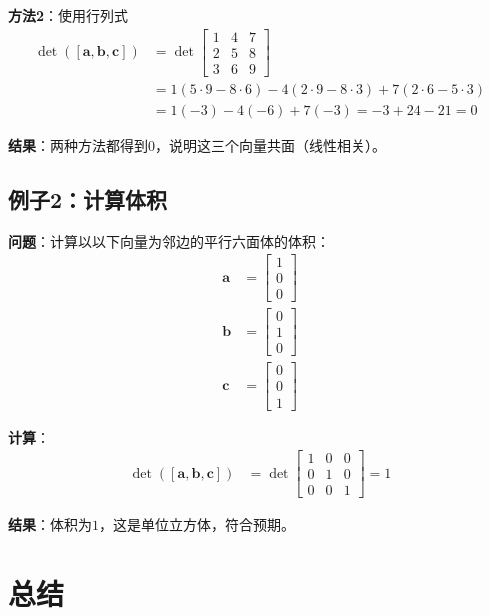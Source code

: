 \documentclass[12pt,a4paper]{article}
\begin{document}
\textbf{方法2}：使用行列式
\begin{align}
\det([\bm{a}, \bm{b}, \bm{c}]) &= \det\begin{bmatrix} 1 & 4 & 7 \\ 2 & 5 & 8 \\ 3 & 6 & 9 \end{bmatrix} \\
&= 1(5 \cdot 9 - 8 \cdot 6) - 4(2 \cdot 9 - 8 \cdot 3) + 7(2 \cdot 6 - 5 \cdot 3) \\
&= 1(-3) - 4(-6) + 7(-3) = -3 + 24 - 21 = 0
\end{align}

\textbf{结果}：两种方法都得到$0$，说明这三个向量共面（线性相关）。

\subsection{例子2：计算体积}

\textbf{问题}：计算以以下向量为邻边的平行六面体的体积：
\begin{align}
\bm{a} &= \begin{bmatrix} 1 \\ 0 \\ 0 \end{bmatrix} \\
\bm{b} &= \begin{bmatrix} 0 \\ 1 \\ 0 \end{bmatrix} \\
\bm{c} &= \begin{bmatrix} 0 \\ 0 \\ 1 \end{bmatrix}
\end{align}

\textbf{计算}：
\begin{align}
\det([\bm{a}, \bm{b}, \bm{c}]) &= \det\begin{bmatrix} 1 & 0 & 0 \\ 0 & 1 & 0 \\ 0 & 0 & 1 \end{bmatrix} = 1
\end{align}

\textbf{结果}：体积为$1$，这是单位立方体，符合预期。

\section{总结}
\end{document}
